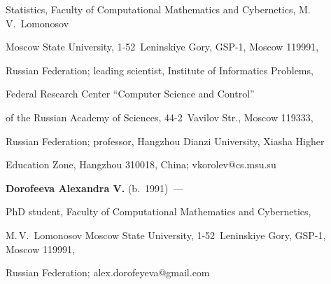 Statistics, Faculty of Computational Mathematics and Cybernetics, M.\,V.~Lomonosov 


Moscow State University, 1-52~Leninskiye Gory, GSP-1, Moscow 119991, 


Russian Federation; leading scientist, Institute of Informatics Problems, 


Federal Research Center ``Computer Science and Control'' 


of the Russian Academy of Sciences, 44-2~Vavilov Str., Moscow 119333, 


Russian Federation; professor, Hangzhou Dianzi University, Xiasha Higher 


Education Zone, Hangzhou 310018, China; \mbox{vkorolev@cs.msu.su}





\vspace*{3pt}





\noindent


\textbf{Dorofeeva Alexandra V.} (b.\ 1991)~--- 


PhD student, Faculty of Computational Mathematics and Cybernetics, 


M.\,V.~Lomonosov Moscow State University, 1-52~Leninskiye Gory, GSP-1, Moscow 119991, 


Russian Federation; \mbox{alex.dorofeyeva@gmail.com}


\label{end\stat}





\renewcommand{\bibname}{\protect\rm Литература}       


